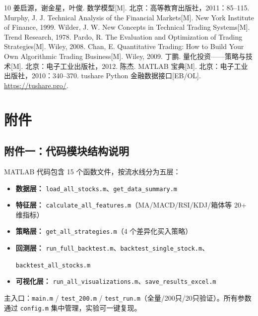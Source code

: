 \documentclass[12pt,a4paper]{ctexart}
\numberwithin{figure}{section}
\numberwithin{table}{section}
\begin{document}
\begin{thebibliography}{10}
     姜启源，谢金星，叶俊. 数学模型[M]. 北京：高等教育出版社，2011：85--115.
     Murphy, J. J. Technical Analysis of the Financial Markets[M]. New York Institute of Finance, 1999.
     Wilder, J. W. New Concepts in Technical Trading Systems[M]. Trend Research, 1978.
     Pardo, R. The Evaluation and Optimization of Trading Strategies[M]. Wiley, 2008.
     Chan, E. Quantitative Trading: How to Build Your Own Algorithmic Trading Business[M]. Wiley, 2009.
     丁鹏. 量化投资——策略与技术[M]. 北京：电子工业出版社，2012.
     陈杰. MATLAB 宝典[M]. 北京：电子工业出版社，2010：340--370.
     tushare Python 金融数据接口[EB/OL]. \url{https://tushare.pro/}.
\end{thebibliography}

\section*{附件}

\subsection*{附件一：代码模块结构说明}

MATLAB 代码包含 15 个函数文件，按流水线分为五层：
\begin{itemize}[leftmargin=*]
    \item {\bfseries 数据层：} \texttt{load\_all\_stocks.m}、\texttt{get\_data\_summary.m}
    \item {\bfseries 特征层：} \texttt{calculate\_all\_features.m}（MA/MACD/RSI/KDJ/箱体等 20+ 维指标）
    \item {\bfseries 策略层：} \texttt{get\_all\_strategies.m}（4 个差异化买入策略）
    \item {\bfseries 回测层：} \texttt{run\_full\_backtest.m}、\texttt{backtest\_single\_stock.m}、\par\texttt{backtest\_all\_stocks.m}
    \item {\bfseries 可视化层：} \texttt{run\_all\_visualizations.m}、\texttt{save\_results\_excel.m}
\end{itemize}
主入口：\texttt{main.m} / \texttt{test\_200.m} / \texttt{test\_run.m}（全量/200只/20只验证）。所有参数通过 \texttt{config.m} 集中管理，实验可一键复现。
\end{document}
